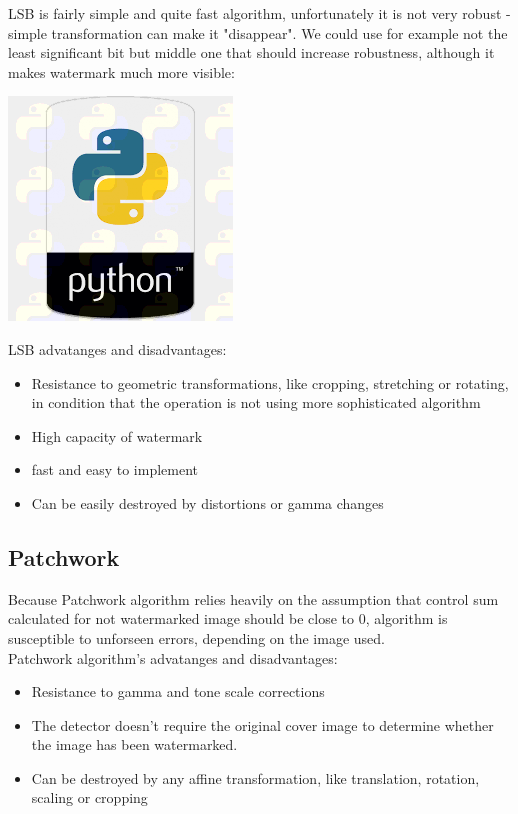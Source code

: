\documentclass[a4paper, 12pt]{article}
\begin{document}
	LSB is fairly simple and quite fast algorithm, unfortunately it is not very robust - simple transformation can make it "disappear". We could use for example not the least significant bit but middle one that should increase robustness, although it makes watermark much more visible:

	 \begin{center}
		\includegraphics[scale=0.5]{python_lsb/watermarked_python_4bit.png}
	\end{center}

\newpage
	LSB advatanges and disadvantages:
	\begin{itemize}
		\item Resistance to geometric transformations, like cropping, stretching or rotating, in condition that the operation is not using more sophisticated algorithm
		\item High capacity of watermark
		\item fast and easy to implement
		\item Can be easily destroyed by distortions or gamma changes
	\end{itemize}

	\subsection{Patchwork}
	
	Because Patchwork algorithm relies heavily on the assumption that control sum calculated for not watermarked image should be close to 0, algorithm is susceptible to unforseen errors, depending on the image used. \\
	
	Patchwork algorithm's advatanges and disadvantages:

	\begin{itemize}
		\item Resistance to gamma and tone scale corrections
		\item The detector doesn’t require the original cover image to determine whether the image has been watermarked.
		\item Can be destroyed by any affine transformation, like translation, rotation, scaling or cropping
	\end{itemize}
\end{document}
